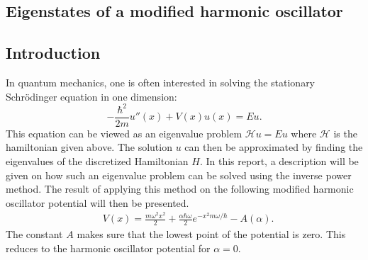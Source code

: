 \documentclass[twocolumn]{article}
\begin{document}
\begin{large}
\section*{Eigenstates of a modified harmonic oscillator}
\subsection*{Introduction}
In quantum mechanics, one is often interested in solving the stationary Schrödinger equation in one dimension:
\begin{equation}
    -\frac{\hbar^2}{2m}u''(x) + V(x)u(x) = Eu.
\end{equation}
This equation can be viewed as an eigenvalue problem $\mathcal{H}u = Eu$ where $\mathcal{H}$ is the hamiltonian given above. The solution $u$ can then be approximated by finding the eigenvalues of the discretized Hamiltonian $H$. In this report, a description will be given on how such an eigenvalue problem can be solved using the inverse power method. The result of applying this method on the following modified harmonic oscillator potential will then be presented.
\begin{equation}
    \label{5apr0811}
    \begin{split}
        &V(x) = \frac{m\omega^2x^2}{2}+\frac{\alpha\hbar\omega}{2}e^{-x^2m\omega/\hbar} - A(\alpha).
    \end{split}
\end{equation}
The constant $A$ makes sure that the lowest point of the potential is zero. This reduces to the harmonic oscillator potential for $\alpha=0$. 


\end{large}
\end{document}
